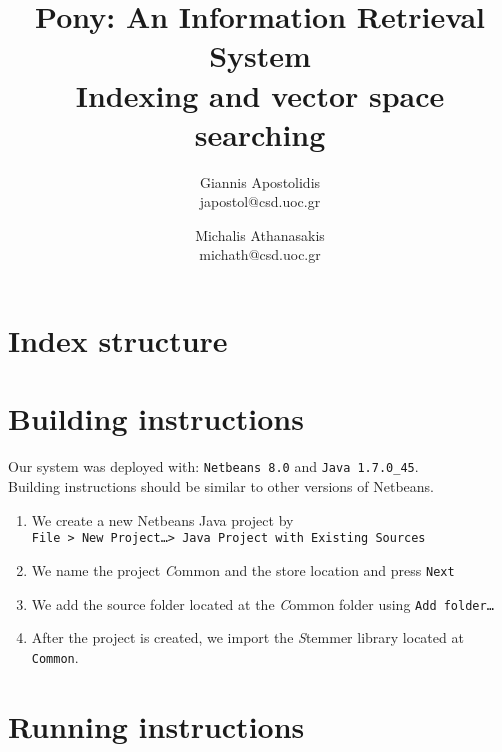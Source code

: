 \documentclass[letterpaper,onecolumn,11pt]{article}
\begin{document}
\date{}

\title{\Large Pony: An Information Retrieval System \\ \scriptsize Indexing and vector space searching}
\author{{\rm Giannis Apostolidis}\\
				{\rm japostol@csd.uoc.gr}\\
				\and
				{\rm Michalis Athanasakis}\\
				{\rm michath@csd.uoc.gr}\\
}

\maketitle

\section{Index structure}


\section{Building instructions}

Our system was deployed with: {\tt Netbeans 8.0} and {\tt Java 1.7.0\_45}.\\
Building instructions should be similar to other versions of Netbeans. 

\begin{enumerate}
	\item We create a new Netbeans Java project by \\
				{\tt File > New Project\ldots  > Java Project with Existing Sources }
	\item We name the project {\emph Common} and the store location and press 
				{\tt Next}
	\item We add the source folder located at the {\emph Common} folder 
				using {\tt Add folder\ldots}
	\item After the project is created, we import the {\emph Stemmer} library 
				located at {\tt Common\dependencies}.
\end{enumerate}

\section{Running instructions}
\end{document}
